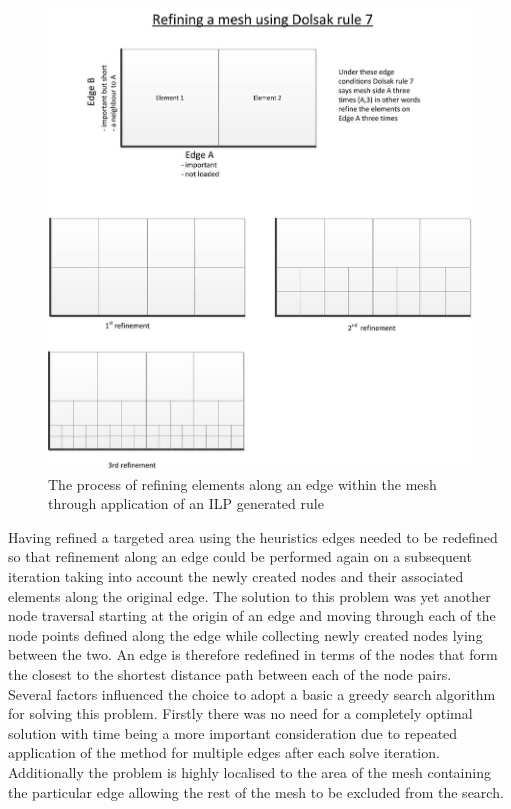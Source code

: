 \begin{figure}[!h]
  \centerline{\includegraphics[width=120mm , scale=1]{../Graphics/EdgeRefinement.jpg}}
  \caption{The process of refining elements along an edge within the mesh through application of an ILP generated rule}
  \label{fig:h-refinementImp}
\end{figure} 


\newpage
\noindent
Having refined a targeted area using the heuristics edges needed to be redefined so that refinement along an edge could be performed again on a subsequent iteration taking into account the newly created nodes and their associated elements along the original edge. The solution to this problem was yet another node traversal starting at the origin of an edge and moving through each of the node points defined along the edge while collecting newly created nodes lying between the two. An edge is therefore redefined in terms of the nodes that form the closest to the shortest distance path between each of the node pairs. \\ 

\noindent
Several factors influenced the choice to adopt a basic a greedy search algorithm for solving this problem. Firstly there was no need for a completely optimal solution with time being a more important consideration due to repeated application of the method for multiple edges after each solve iteration. Additionally the problem is highly localised to the area of the mesh containing the particular edge allowing the rest of the mesh to be excluded from the search. \\

